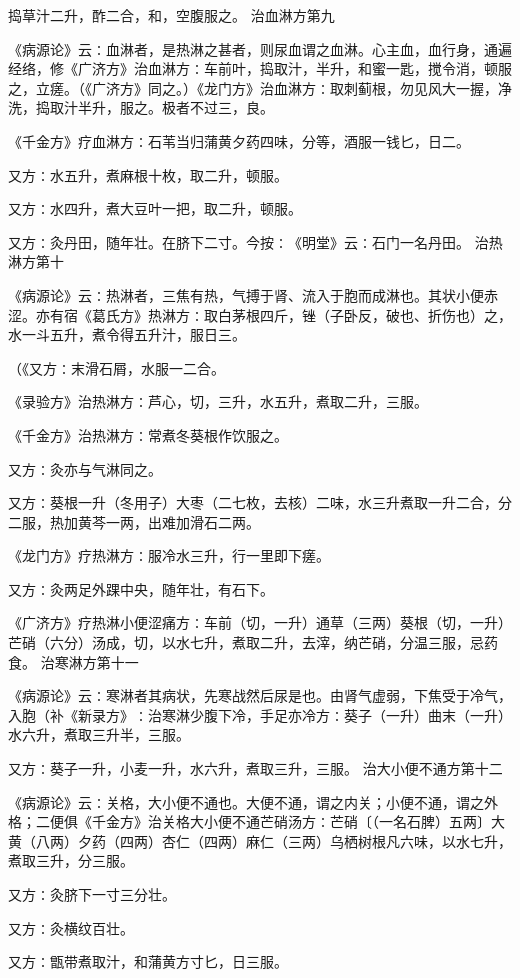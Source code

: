 \documentclass[a4paper,12pt,UTF8,twoside]{ctexbook}
\begin{document}
捣草汁二升，酢二合，和，空腹服之。
治血淋方第九

《病源论》云∶血淋者，是热淋之甚者，则尿血谓之血淋。心主血，血行身，通遍经络，修《广济方》治血淋方∶车前叶，捣取汁，半升，和蜜一匙，搅令消，顿服之，立瘥。（《广济方》同之。）《龙门方》治血淋方∶取刺蓟根，勿见风大一握，净洗，捣取汁半升，服之。极者不过三，良。

《千金方》疗血淋方∶石苇当归蒲黄夕药四味，分等，酒服一钱匕，日二。

又方∶水五升，煮麻根十枚，取二升，顿服。

又方∶水四升，煮大豆叶一把，取二升，顿服。

又方∶灸丹田，随年壮。在脐下二寸。今按∶《明堂》云∶石门一名丹田。
治热淋方第十

《病源论》云∶热淋者，三焦有热，气搏于肾、流入于胞而成淋也。其状小便赤涩。亦有宿《葛氏方》热淋方∶取白茅根四斤，锉（子卧反，破也、折伤也）之，水一斗五升，煮令得五升汁，服日三。

（《又方∶末滑石屑，水服一二合。

《录验方》治热淋方∶芦心，切，三升，水五升，煮取二升，三服。

《千金方》治热淋方∶常煮冬葵根作饮服之。

又方∶灸亦与气淋同之。

又方∶葵根一升（冬用子）大枣（二七枚，去核）二味，水三升煮取一升二合，分二服，热加黄芩一两，出难加滑石二两。

《龙门方》疗热淋方∶服冷水三升，行一里即下瘥。

又方∶灸两足外踝中央，随年壮，有石下。

《广济方》疗热淋小便涩痛方∶车前（切，一升）通草（三两）葵根（切，一升）芒硝（六分）汤成，切，以水七升，煮取二升，去滓，纳芒硝，分温三服，忌药食。
治寒淋方第十一

《病源论》云∶寒淋者其病状，先寒战然后尿是也。由肾气虚弱，下焦受于冷气，入胞（补《新录方》∶治寒淋少腹下冷，手足亦冷方∶葵子（一升）曲末（一升）水六升，煮取三升半，三服。

又方∶葵子一升，小麦一升，水六升，煮取三升，三服。
治大小便不通方第十二

《病源论》云∶关格，大小便不通也。大便不通，谓之内关；小便不通，谓之外格；二便俱《千金方》治关格大小便不通芒硝汤方∶芒硝〔（一名石脾）五两〕大黄（八两）夕药（四两）杏仁（四两）麻仁（三两）乌栖树根凡六味，以水七升，煮取三升，分三服。

又方∶灸脐下一寸三分壮。

又方∶灸横纹百壮。

又方∶甑带煮取汁，和蒲黄方寸匕，日三服。
\end{document}
